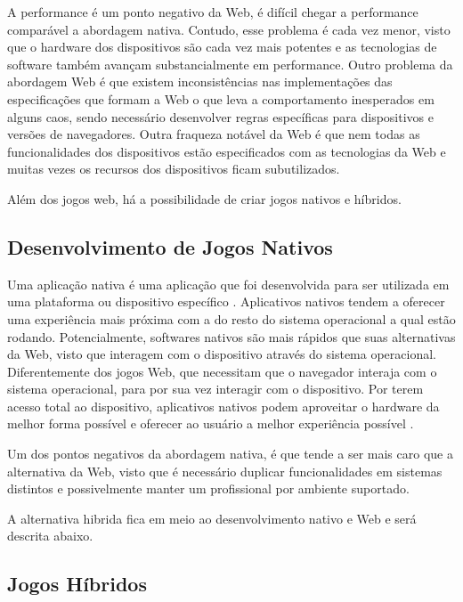 A performance é um ponto negativo da Web, é difícil chegar a
performance comparável a abordagem nativa. Contudo, esse problema
é cada vez menor, visto que o hardware dos dispositivos são cada
vez mais potentes e as tecnologias de software também avançam
substancialmente em performance. Outro problema da abordagem Web é que
existem inconsistências nas implementações das especificações que
formam a Web o que leva a comportamento inesperados em alguns caos,
sendo necessário desenvolver regras específicas para dispositivos
e versões de navegadores. Outra fraqueza notável da Web é que nem
todas as funcionalidades dos dispositivos estão especificados com as
tecnologias da Web e muitas vezes os recursos dos dispositivos ficam
subutilizados.

Além dos jogos web, há a possibilidade de criar jogos nativos e híbridos.

\subsection{Desenvolvimento de Jogos Nativos}

Uma aplicação nativa é uma aplicação que foi desenvolvida para ser
utilizada em uma plataforma ou dispositivo específico \autocite[p.
7]{aSeriousContender}. Aplicativos nativos tendem a oferecer uma
experiência mais próxima com a do resto do sistema operacional a qual
estão rodando. Potencialmente, softwares nativos são mais rápidos
que suas alternativas da Web, visto que interagem com o dispositivo
através do sistema operacional. Diferentemente dos jogos Web, que
necessitam que o navegador interaja com o sistema operacional, para
por sua vez interagir com o dispositivo. Por terem acesso total ao
dispositivo, aplicativos nativos podem aproveitar o hardware da melhor
forma possível e oferecer ao usuário a melhor experiência possível
\autocite[p. 7]{aSeriousContender}.

Um dos pontos negativos da abordagem nativa, é que tende a ser mais
caro que a alternativa da Web, visto que é necessário duplicar
funcionalidades em sistemas distintos e possivelmente manter um
profissional por ambiente suportado.

A alternativa hibrida fica em meio ao desenvolvimento nativo e Web e
será descrita abaixo.

\subsection{Jogos Híbridos}

